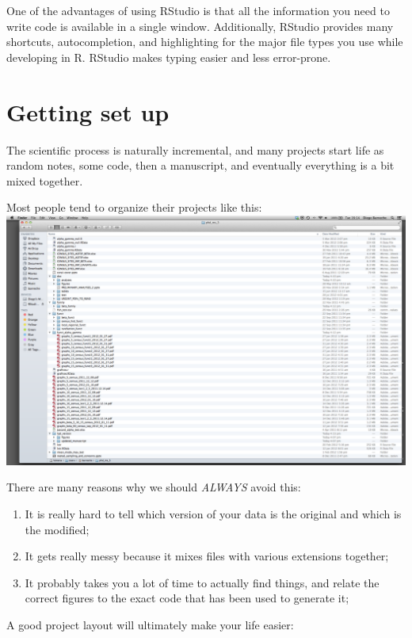 \documentclass[]{book}
\providecommand{\tightlist}{%
  \setlength{\itemsep}{0pt}\setlength{\parskip}{0pt}}
\begin{document}
One of the advantages of using RStudio is that all the information you
need to write code is available in a single window. Additionally,
RStudio provides many shortcuts, autocompletion, and highlighting for
the major file types you use while developing in R. RStudio makes typing
easier and less error-prone.

\section{Getting set up}\label{getting-set-up}

The scientific process is naturally incremental, and many projects start
life as random notes, some code, then a manuscript, and eventually
everything is a bit mixed together.

Most people tend to organize their projects like this:
\includegraphics{./fig/bad_layout.png}

There are many reasons why we should \emph{ALWAYS} avoid this:

\begin{enumerate}
\def\labelenumi{\arabic{enumi}.}
\tightlist
\item
  It is really hard to tell which version of your data is the original
  and which is the modified;
\item
  It gets really messy because it mixes files with various extensions
  together;
\item
  It probably takes you a lot of time to actually find things, and
  relate the correct figures to the exact code that has been used to
  generate it;
\end{enumerate}

A good project layout will ultimately make your life easier:
\end{document}
